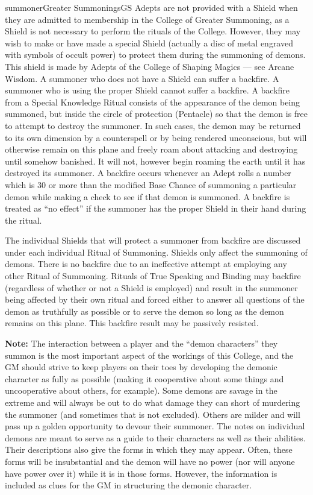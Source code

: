 \begin{college}[1.0]{summoner}{Greater Summonings}{GS}
Adepts are not provided with a Shield when they are admitted to
membership in the College of Greater Summoning, as a Shield is not
necessary to perform the rituals of the College.  However, they may
wish to make or have made a special Shield (actually a disc of metal
engraved with symbols of occult power) to protect them during the
summoning of demons. This shield is made by Adepts of the College of
Shaping Magics --- see Arcane Wisdom.  A summoner who does not have a
Shield can suffer a backfire.  A summoner who is using the proper
Shield cannot suffer a backfire.  A backfire from a Special Knowledge
Ritual consists of the appearance of the demon being summoned, but
inside the circle of protection (Pentacle) so that the demon is free
to attempt to destroy the summoner.  In such cases, the demon may be
returned to its own dimension by a counterspell or by being rendered
unconscious, but will otherwise remain on this plane and freely roam
about attacking and destroying until somehow banished.  It will not,
however begin roaming the earth until it has destroyed its summoner.
A backfire occurs whenever an Adept rolls a number which is 30 or more
than the modified Base Chance of summoning a particular demon while
making a check to see if that demon is summoned. A backfire is treated
as ``no effect'' if the summoner has the proper Shield in their hand
during the ritual.

The individual Shields that will protect a summoner from backfire are
discussed under each individual Ritual of Summoning.  Shields only
affect the summoning of demons.  There is no backfire due to an
ineffective attempt at employing any other Ritual of Summoning.
Rituals of True Speaking and Binding may backfire (regardless of
whether or not a Shield is employed) and result in the summoner being
affected by their own ritual and forced either to answer all questions
of the demon as truthfully as possible or to serve the demon so long
as the demon remains on this plane.  This backfire result may be
passively resisted.

\textbf{Note:} The interaction between a player and the ``demon
characters'' they summon is the most important aspect of the workings
of this College, and the GM should strive to keep players on their
toes by developing the demonic character as fully as possible (making
it cooperative about some things and uncooperative about others, for
example).  Some demons are savage in the extreme and will always be
out to do what damage they can short of murdering the summoner (and
sometimes that is not excluded).  Others are milder and will pass up a
golden opportunity to devour their summoner.  The notes on individual
demons are meant to serve as a guide to their characters as well as
their abilities. Their descriptions also give the forms in which they
may appear.  Often, these forms will be insubstantial and the demon
will have no power (nor will anyone have power over it) while it is in
those forms.  However, the information is included as clues for the GM
in structuring the demonic character.


\end{college}
